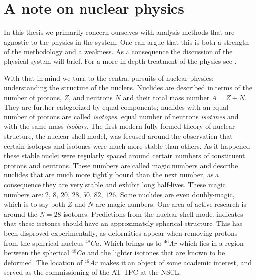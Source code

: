 

\section{A note on nuclear physics}

In this thesis we primarily concern ourselves with analysis methods that are agnostic to the physics in the system. One can argue that this is both a strength of the methodology and a weakness. As a consequence the discussion of the physical system will brief. For a more in-depth treatment of the physics  see \cite{Bradt2017}. 

With that in mind we turn to the central pursuits of nuclear physics: understanding the structure of the nucleus. Nuclides are described in terms of the number of protons, $Z$, and neutrons $N$ and their total mass number $A = Z +N$. They are further categorized by equal components; nuclides with an equal number of protons are called \textit{isotopes}, equal number of neutrons \textit{isotones} and with the same  mass \textit{isobars}. The first modern fully-formed theory of nuclear structure, the nuclear shell model, was focused around the observation that certain isotopes and isotones were much more stable than others. As it happened these stable nuclei were regularly spaced around certain numbers of constituent protons and neutrons. These numbers are called magic numbers and describe nuclides that are much more tightly bound than the next number, as a consequence they are very stable and exhibit long half-lives. These magic numbers are: $2 ,\, 8 ,\, 20 ,\, 28 ,\, 50 ,\, 82 ,\, 126$. Some nuclides are even doubly-magic, which is to say both $Z$ and $N$ are magic numbers. One area of active research is around the $N=28$ isotones. Predictions from the nuclear shell model indicates that these isotones should have an approximately spherical structure. This has been disproved experimentally, as deformities appear when removing protons from the spherical nucleus ${}^{48}Ca$. Which brings us to ${}^{46}Ar$ which lies in a region between the spherical ${}^{48}Ca$ and the lighter isotones that are known to be deformed. The location of ${}^{46}Ar$ makes it an object of some academic interest, and served as the commissioning of the AT-TPC at the NSCL. 


